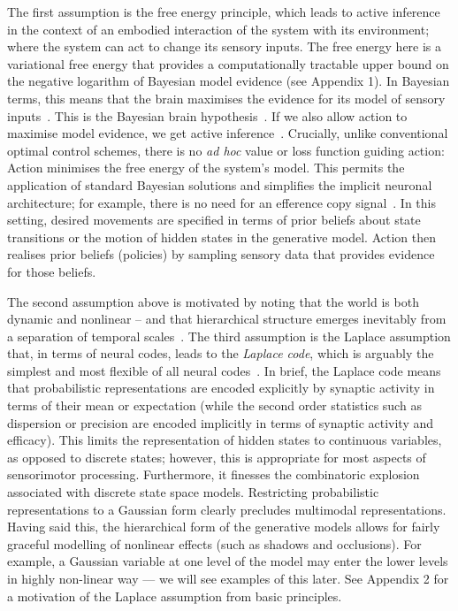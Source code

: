\documentclass[a4paper]{article} %
\begin{document}
The first assumption is the free energy principle, which leads to active
inference in the context of an embodied interaction of the system with
its environment; where the system can act to change its sensory inputs.
The free energy here is a variational free energy that provides a
computationally tractable upper bound on the negative logarithm of
Bayesian model evidence (see Appendix 1). In Bayesian terms, this means
that the brain maximises the evidence for its model of sensory inputs~\citep{Ballard83,Bialek01,Dayan95,Gregory80,Grossberg97,Knill04,Olshausen96}. This is the Bayesian brain hypothesis~\citep{Yuille06}. %
If we also allow action to maximise model evidence, we get active
inference~\citep{Friston10a}. Crucially, unlike conventional optimal
control schemes, there is no \emph{ad hoc} value or loss function guiding
action: Action minimises the free energy of the system's model. This
permits the application of standard Bayesian solutions and simplifies
the implicit neuronal architecture; for example, there is no need for an
efference copy signal~\citep{Friston11}. In this setting, desired movements
are specified in terms of prior beliefs about state transitions or the
motion of hidden states in the generative model. Action then realises
prior beliefs (policies) by sampling sensory data that provides evidence
for those beliefs. %

The second assumption above is motivated by noting that the world is
both dynamic and nonlinear -- and that hierarchical structure emerges
inevitably from a separation of temporal scales~\citep{Ginzburg55,Haken83}. The third assumption is the Laplace assumption that, in terms of
neural codes, leads to the \emph{Laplace code}, which is arguably the
simplest and most flexible of all neural codes~\citep{Friston09a}.  %
%
In brief, the Laplace code means that probabilistic representations are encoded explicitly by synaptic activity in terms of their mean or expectation (while the second order statistics such as dispersion or precision are encoded implicitly in terms of synaptic activity and efficacy). This limits the representation of hidden states to continuous variables, as opposed to discrete states; however, this is appropriate for most aspects of sensorimotor processing. Furthermore, it finesses the combinatoric explosion associated with discrete state space models. Restricting probabilistic representations to a Gaussian form clearly precludes multimodal representations. Having said this, the hierarchical form of the generative models allows for fairly graceful modelling of nonlinear effects (such as shadows and occlusions). For example, a Gaussian variable at one level of the model may enter the lower levels in highly non-linear way --- we will see examples of this later. %
See Appendix 2 for a motivation of the Laplace assumption from basic principles.
\end{document}
